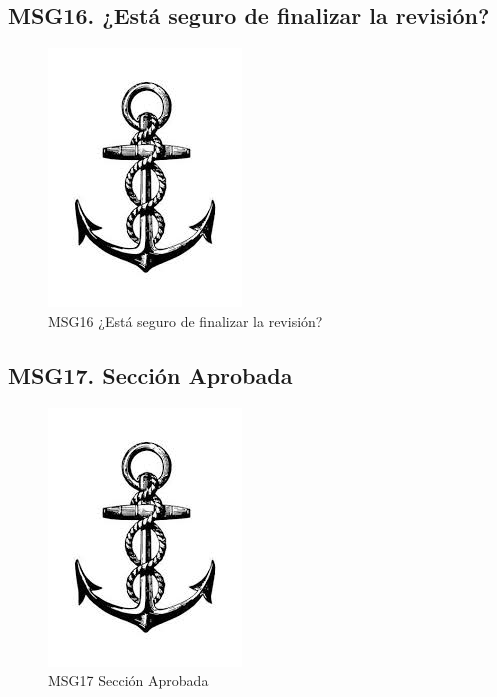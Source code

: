 \subsection{MSG16. ¿Está seguro de finalizar la revisión?}
    \begin{figure}[htbp]
        \begin{center}
            \includegraphics[width=.4\textwidth]{images/MSG/ancla}
            \caption{MSG16 ¿Está seguro de finalizar la revisión?}
            \label{fig:MSG16}
        \end{center}
    \end{figure}

\subsection{MSG17. Sección Aprobada}
    \begin{figure}[htbp]
        \begin{center}
            \includegraphics[width=.4\textwidth]{images/MSG/ancla}
            \caption{MSG17 Sección Aprobada}
            \label{fig:MSG17}
        \end{center}
    \end{figure}


